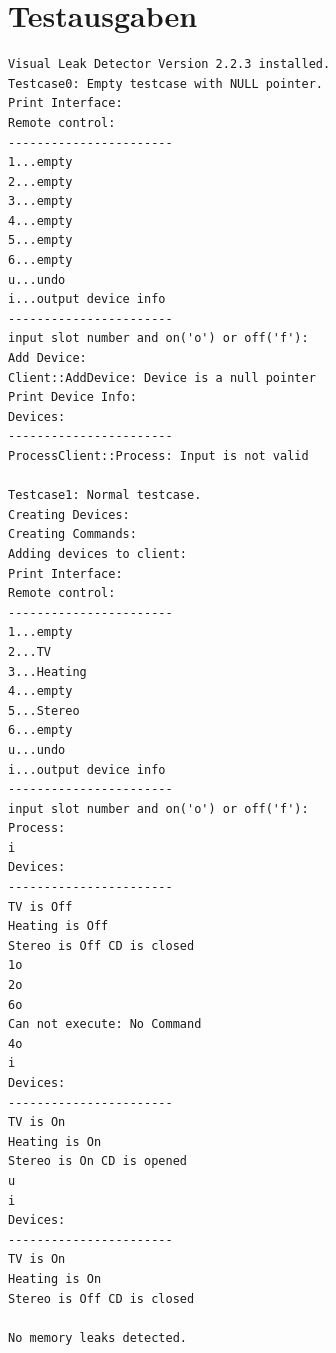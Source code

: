 \documentclass[12pt,a4paper]{article}
\begin{document}



\newpage


\newpage

\section {Testausgaben} 

\begin {verbatim}
Visual Leak Detector Version 2.2.3 installed.
Testcase0: Empty testcase with NULL pointer.
Print Interface:
Remote control:
-----------------------
1...empty
2...empty
3...empty
4...empty
5...empty
6...empty
u...undo
i...output device info
-----------------------
input slot number and on('o') or off('f'):
Add Device:
Client::AddDevice: Device is a null pointer
Print Device Info:
Devices:
-----------------------
ProcessClient::Process: Input is not valid

Testcase1: Normal testcase.
Creating Devices:
Creating Commands:
Adding devices to client:
Print Interface:
Remote control:
-----------------------
1...empty
2...TV
3...Heating
4...empty
5...Stereo
6...empty
u...undo
i...output device info
-----------------------
input slot number and on('o') or off('f'):
Process:
i
Devices:
-----------------------
TV is Off
Heating is Off
Stereo is Off CD is closed
1o
2o
6o
Can not execute: No Command
4o
i
Devices:
-----------------------
TV is On
Heating is On
Stereo is On CD is opened
u
i
Devices:
-----------------------
TV is On
Heating is On
Stereo is Off CD is closed

No memory leaks detected.
\end {verbatim}
\end{document}
